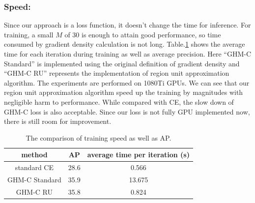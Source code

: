\documentclass[letterpaper]{article} %
\begin{document}
\subsubsection{Speed:} Since our approach is a loss function, it doesn't change the time for inference. For training, a small $M$ of 30 is enough to attain good performance, so time consumed by gradient density calculation is not long. Table.\ref{tab:speed} shows the average time for each iteration during training as well as average precision. Here ``GHM-C Standard'' is implemented using the original definition of gradient density and ``GHM-C RU'' represents the implementation of region unit approximation algorithm. The experiments are performed on 1080Ti GPUs. We can see that our region unit approximation algorithm speed up the training by magnitudes with negligible harm to performance. While compared with CE, the slow down of  GHM-C loss is also acceptable. Since our loss is not fully GPU implemented now, there is still room for improvement.
\begin{table}[!ht]
\begin{center}
\begin{tabular}{| c | c | c |}
\hline
method & AP & average time per iteration (s) \\
\hline
standard CE & 28.6 & 0.566 \\
GHM-C Standard & 35.9 & 13.675 \\
GHM-C RU & 35.8 & 0.824 \\
\hline 
\end{tabular}
\caption{The comparison of training speed as well as AP.}
\label{tab:speed}
\end{center}
\end{table}
\end{document}
